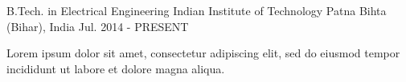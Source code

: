 \begin{cventries}
  \cventry
    {B.Tech. in Electrical Engineering}
    {Indian Institute of Technology Patna}
    {Bihta (Bihar), India}
    {Jul. 2014 - PRESENT}
    {
      \begin{cvitems}
        \item {Lorem ipsum dolor sit amet, consectetur adipiscing elit, sed do eiusmod tempor incididunt ut labore et dolore magna aliqua.}
      \end{cvitems}
    }
\end{cventries}
